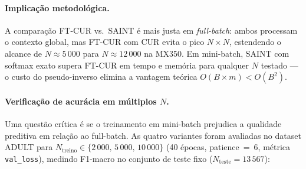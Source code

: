 \documentclass[12pt,a4paper]{article}
\begin{document}
\paragraph{Implicação metodológica.}
A comparação FT-CUR vs.\ SAINT é mais justa em \emph{full-batch}: ambos
processam o contexto global, mas FT-CUR com CUR evita o pico $N{\times}N$,
estendendo o alcance de $N{\approx}5\,000$ para $N{\approx}12\,000$ na MX350.
Em mini-batch, SAINT com softmax exato supera FT-CUR em tempo e memória para
qualquer $N$ testado — o custo do pseudo-inverso elimina a vantagem teórica
$O(B{\times}m) < O(B^2)$.

\paragraph{Verificação de acurácia em múltiplos $N$.}
Uma questão crítica é se o treinamento em mini-batch prejudica a qualidade
preditiva em relação ao full-batch. As quatro variantes foram avaliadas no
dataset ADULT para $N_{\text{treino}} \in \{2\,000,\,5\,000,\,10\,000\}$
(40 épocas, patience~=~6, métrica \texttt{val\_loss}), medindo F1-macro no
conjunto de teste fixo ($N_{\text{teste}}{=}13\,567$):

\begin{table}[H]
\centering
\caption{F1-macro e tempo total de treino para as quatro variantes em múltiplos
$N$. ADULT, GPU MX350. OOM = estouro de memória durante o treino.
SAINT-mini: $B{=}1024$; FT-CUR-mini: $B{=}4096$, $m_{\text{batch}}{=}10\%B$.}
\label{tab:saint_cur_accuracy}
\end{table}
\end{document}
